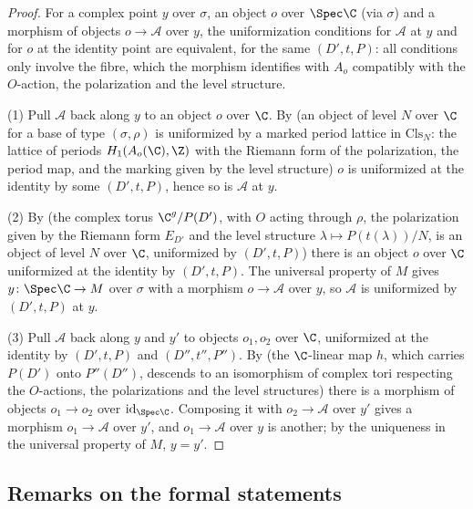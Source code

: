 \begin{proof}
For a complex point $y$ over $\sigma$, an object $o$ over $\Spec\C$ (via $\sigma$) and a morphism of
objects $o\to\mathcal A$ over $y$, the uniformization conditions for $\mathcal A$ at $y$ and for $o$
at the identity point are equivalent, for the same $(D',t,P)$: all conditions only involve the fibre,
which the morphism identifies with $A_o$ compatibly with the $O$-action, the polarization and the
level structure.

(1) Pull $\mathcal A$ back along $y$ to an object $o$ over $\C$. By
 (an object of level $N$ over
$\C$ for a base of type $(\sigma,\rho)$ is uniformized by a marked period lattice in
$\mathrm{Cls}_N$: the lattice of periods $H_1(A_o(\C),\Z)$ with the Riemann form of the polarization,
the period map, and the marking given by the level structure) $o$ is uniformized at the identity by
some $(D',t,P)$, hence so is $\mathcal A$ at $y$.

(2) By  (the complex torus
$\C^g/P(D')$, with $O$ acting through $\rho$, the polarization given by the Riemann form $E_{D'}$ and
the level structure $\lambda\mapsto P(t(\lambda))/N$, is an object of level $N$ over $\C$, uniformized
by $(D',t,P)$) there is an object $o$ over $\C$ uniformized at the identity by $(D',t,P)$. The
universal property of $M$ gives $y\colon\Spec\C\to M$ over $\sigma$ with a morphism $o\to\mathcal A$
over $y$, so $\mathcal A$ is uniformized by $(D',t,P)$ at $y$.

(3) Pull $\mathcal A$ back along $y$ and $y'$ to objects $o_1,o_2$ over $\C$, uniformized at the
identity by $(D',t,P)$ and $(D'',t'',P'')$. By
 (the $\C$-linear map $h$,
which carries $P(D')$ onto $P''(D'')$, descends to an isomorphism of complex tori respecting the
$O$-actions, the polarizations and the level structures) there is a morphism of objects $o_1\to o_2$
over $\mathrm{id}_{\Spec\C}$. Composing it with $o_2\to\mathcal A$ over $y'$ gives a morphism
$o_1\to\mathcal A$ over $y'$, and $o_1\to\mathcal A$ over $y$ is another; by the uniqueness in the
universal property of $M$, $y=y'$.
\end{proof}

\subsection{Remarks on the formal statements}\label{pf:ks2:sec:remarks}

